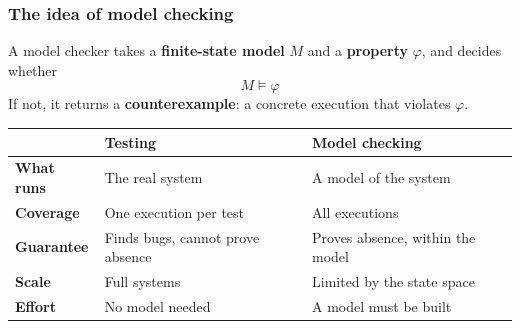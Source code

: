 \begin{frame}
  \frametitle{The idea of model checking} \small

\begin{block}{}\small
A model checker takes a {\bf finite-state model} $M$ and a {\bf property} $\varphi$,
and decides whether
\[
M \models \varphi
\]
If not, it returns a {\bf counterexample}: a concrete execution that violates $\varphi$.
\end{block}

\pause
\vspace{0.3cm}

\begin{center}\small
\renewcommand{\arraystretch}{1.25}
\begin{tabular}{|l|p{3.5cm}|p{3.9cm}|}
\hline
\rowcolor{blue!10}
& {\bf Testing} & {\bf Model checking}\\
\hline
{\bf What runs}  & The real system        & A model of the system\\
\hline
{\bf Coverage}   & One execution per test & All executions\\
\hline
{\bf Guarantee}  & Finds bugs, cannot prove absence & Proves absence, within the model\\
\hline
{\bf Scale}      & Full systems           & Limited by the state space\\
\hline
{\bf Effort}     & No model needed        & A model must be built\\
\hline
\end{tabular}
\end{center}

\end{frame}
